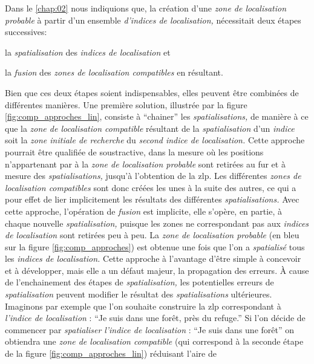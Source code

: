 Dans le \autoref{chap:02} nous indiquions que, la création d'une
\emph{zone de localisation probable} à partir d'un ensemble
\emph{d'indices de localisation,} nécessitait deux étapes successives:
% 
\begin{enumerate*}[label=(\alph*)]
\item la \emph{spatialisation} des \emph{indices de localisation} et
\item la \emph{fusion} des \emph{zones de localisation compatibles} en
résultant.
\end{enumerate*}
% 
Bien que ces deux étapes soient indispensables, elles peuvent être
combinées de différentes manières. Une première solution, illustrée
par la figure \ref{fig:comp_approches_lin}, consiste à
\enquote{chainer} les \emph{spatialisations,} de manière à ce que la
\emph{zone de localisation compatible} résultant de la
\emph{spatialisation} d'un \emph{indice} soit la \emph{zone initiale
  de recherche} du \emph{second indice de localisation.} Cette
approche pourrait être qualifiée de soustractive, dans la mesure où
les positions n'appartenant par à la \emph{zone de localisation
  probable} sont retirées au fur et à mesure des
\emph{spatialisations,} jusqu'à l'obtention de la \ac{zlp}. Les
différentes \emph{zones de localisation compatibles} sont donc créées
les unes à la suite des autres, ce qui a pour effet de lier
implicitement les résultats des différentes \emph{spatialisations.}
Avec cette approche, l'opération de \emph{fusion} est implicite, elle
s'opère, en partie, à chaque nouvelle \emph{spatialisation,} puisque
les zones ne correspondant pas aux \emph{indices de localisation} sont
retirées peu à peu. La \emph{zone de localisation probable} (en bleu
sur la figure \ref{fig:comp_approches}) est obtenue une fois que l'on
a \emph{spatialisé} tous les \emph{indices de localisation.} Cette
approche à l'avantage d'être simple à concevoir et à développer, mais
elle a un défaut majeur, la propagation des erreurs. À cause de
l'enchainement des étapes de \emph{spatialisation,} les potentielles
erreurs de \emph{spatialisation} peuvent modifier le résultat des
\emph{spatialisations} ultérieures. Imaginons par exemple que l'on
souhaite construire la \ac{zlp} correspondant à \emph{l'indice de
  localisation} : \enquote{Je suis dans une forêt, près du refuge.} Si
l'on décide de commencer par \emph{spatialiser} \emph{l'indice de
  localisation} : \enquote{Je suis dans une forêt} on obtiendra une
\emph{zone de localisation compatible} (qui correspond à la seconde
étape de la figure \ref{fig:comp_approches_lin}) réduisant l'aire de
